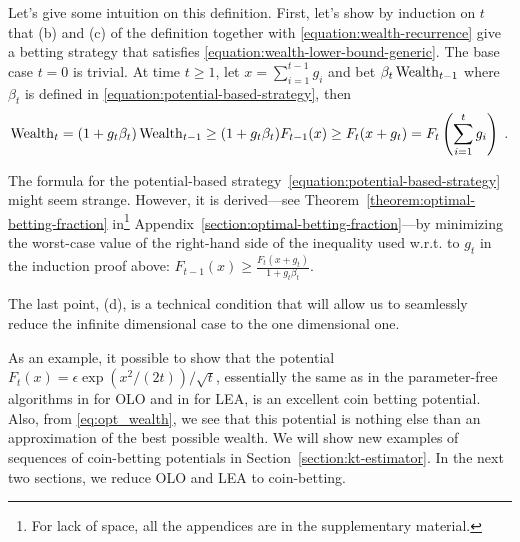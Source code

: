 Let's give some intuition on this definition.  First, let's show by induction
on $t$ that (b) and (c) of the definition together with
\eqref{equation:wealth-recurrence} give a betting strategy that satisfies
\eqref{equation:wealth-lower-bound-generic}. The base case $t=0$ is trivial. At
time $t \ge 1$, let $x = \sum_{i=1}^{t-1} g_i$ and bet $\beta_t \operatorname{Wealth}_{t-1}$
where $\beta_t$ is defined in \eqref{equation:potential-based-strategy}, then
\vspace{-.2cm}
\[
\operatorname{Wealth}_t
= (1+g_t \beta_t) \operatorname{Wealth}_{t-1}
\ge (1 + g_t \beta_t) F_{t-1}(x)
\ge F_t(x + g_t)
= F_t \left( \sum_{i=1}^t g_i \right) \; .
\]

The formula for the potential-based
strategy~\eqref{equation:potential-based-strategy} might seem strange. However,
it is derived---see Theorem~\ref{theorem:optimal-betting-fraction} in\footnote{For lack of space, all the appendices are in the supplementary material.}
Appendix~\ref{section:optimal-betting-fraction}---by minimizing the worst-case
value of the right-hand side of the inequality used w.r.t. to $g_t$ in the
induction proof above: $F_{t-1}(x) \ge \tfrac{F_{t}(x + g_t)}{1+g_t\beta_t}$.

The last point, (d), is a technical condition that will allow us to
seamlessly reduce the infinite dimensional case to the one dimensional one.

As an example, it possible to show that the potential $F_t(x)=\epsilon
\exp \left(x^2/(2t)\right)/\sqrt{t}$, essentially the same as in
the parameter-free algorithms in \cite{McMahan-Orabona-2014, Orabona-2014} for
\ac{OLO} and in \cite{Chaudhuri-Freund-Hsu-2009, Luo-Schapire-2014,
Luo-Schapire-2015} for \ac{LEA}, is an excellent coin betting potential.  Also, from \eqref{eq:opt_wealth}, we see that this potential is nothing else than an approximation of the best possible wealth.
We will show new examples of sequences of coin-betting potentials in
Section~\ref{section:kt-estimator}.  In the next two sections, we reduce
\ac{OLO} and \ac{LEA} to coin-betting.
